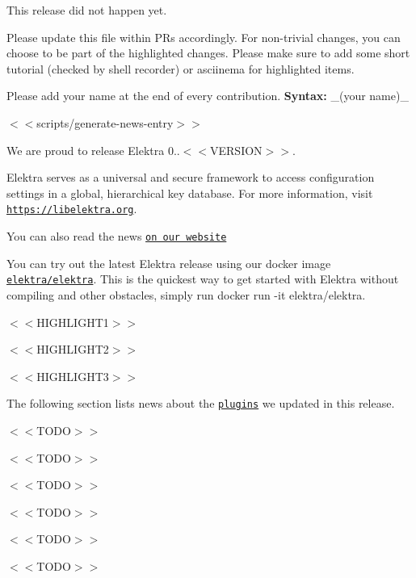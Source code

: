 This release did not happen yet.

Please update this file within P\+Rs accordingly. For non-\/trivial changes, you can choose to be part of the highlighted changes. Please make sure to add some short tutorial (checked by shell recorder) or asciinema for highlighted items.

Please add your name at the end of every contribution. {\bfseries Syntax\+:} \+\_\+(your name)\+\_\+

$<$$<${\ttfamily scripts/generate-\/news-\/entry}$>$$>$

We are proud to release Elektra 0..$<$$<$\+V\+E\+R\+S\+I\+O\+N$>$$>$.

Elektra serves as a universal and secure framework to access configuration settings in a global, hierarchical key database. For more information, visit \href{https://libelektra.org}{\tt https\+://libelektra.\+org}.

You can also read the news \href{https://www.libelektra.org/news/0.9.<<VERSION>>-release}{\tt on our website}

You can try out the latest Elektra release using our docker image \href{https://hub.docker.com/r/elektra/elektra}{\tt elektra/elektra}. This is the quickest way to get started with Elektra without compiling and other obstacles, simply run {\ttfamily docker run -\/it elektra/elektra}.


\begin{DoxyItemize}
\item $<$$<$\+H\+I\+G\+H\+L\+I\+G\+H\+T1$>$$>$
\item $<$$<$\+H\+I\+G\+H\+L\+I\+G\+H\+T2$>$$>$
\item $<$$<$\+H\+I\+G\+H\+L\+I\+G\+H\+T3$>$$>$
\end{DoxyItemize}

The following section lists news about the \href{https://www.libelektra.org/plugins/readme}{\tt plugins} we updated in this release.


\begin{DoxyItemize}
\item $<$$<$\+T\+O\+D\+O$>$$>$
\item $<$$<$\+T\+O\+D\+O$>$$>$
\item $<$$<$\+T\+O\+D\+O$>$$>$
\end{DoxyItemize}


\begin{DoxyItemize}
\item $<$$<$\+T\+O\+D\+O$>$$>$
\item $<$$<$\+T\+O\+D\+O$>$$>$
\item $<$$<$\+T\+O\+D\+O$>$$>$
\end{DoxyItemize}


